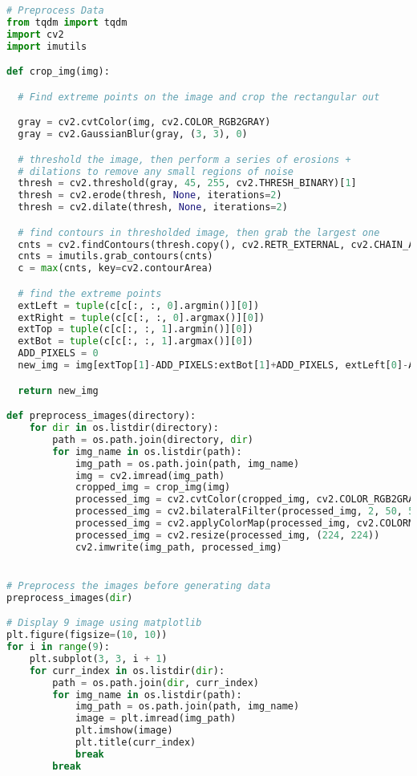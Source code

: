 \begin{lstlisting}[language=Python]
# Preprocess Data
from tqdm import tqdm
import cv2
import imutils

def crop_img(img):

  # Find extreme points on the image and crop the rectangular out

  gray = cv2.cvtColor(img, cv2.COLOR_RGB2GRAY)
  gray = cv2.GaussianBlur(gray, (3, 3), 0)

  # threshold the image, then perform a series of erosions +
  # dilations to remove any small regions of noise
  thresh = cv2.threshold(gray, 45, 255, cv2.THRESH_BINARY)[1]
  thresh = cv2.erode(thresh, None, iterations=2)
  thresh = cv2.dilate(thresh, None, iterations=2)

  # find contours in thresholded image, then grab the largest one
  cnts = cv2.findContours(thresh.copy(), cv2.RETR_EXTERNAL, cv2.CHAIN_APPROX_SIMPLE)
  cnts = imutils.grab_contours(cnts)
  c = max(cnts, key=cv2.contourArea)

  # find the extreme points
  extLeft = tuple(c[c[:, :, 0].argmin()][0])
  extRight = tuple(c[c[:, :, 0].argmax()][0])
  extTop = tuple(c[c[:, :, 1].argmin()][0])
  extBot = tuple(c[c[:, :, 1].argmax()][0])
  ADD_PIXELS = 0
  new_img = img[extTop[1]-ADD_PIXELS:extBot[1]+ADD_PIXELS, extLeft[0]-ADD_PIXELS:extRight[0]+ADD_PIXELS].copy()

  return new_img

def preprocess_images(directory):
    for dir in os.listdir(directory):
        path = os.path.join(directory, dir)
        for img_name in os.listdir(path):
            img_path = os.path.join(path, img_name)
            img = cv2.imread(img_path)
            cropped_img = crop_img(img)
            processed_img = cv2.cvtColor(cropped_img, cv2.COLOR_RGB2GRAY)
            processed_img = cv2.bilateralFilter(processed_img, 2, 50, 50)
            processed_img = cv2.applyColorMap(processed_img, cv2.COLORMAP_BONE)
            processed_img = cv2.resize(processed_img, (224, 224))
            cv2.imwrite(img_path, processed_img)


# Preprocess the images before generating data
preprocess_images(dir)

# Display 9 image using matplotlib
plt.figure(figsize=(10, 10))
for i in range(9):
    plt.subplot(3, 3, i + 1)
    for curr_index in os.listdir(dir):
        path = os.path.join(dir, curr_index)
        for img_name in os.listdir(path):
            img_path = os.path.join(path, img_name)
            image = plt.imread(img_path)
            plt.imshow(image)
            plt.title(curr_index)
            break
        break

\end{lstlisting}
